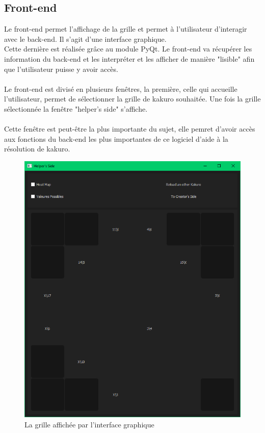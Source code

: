 \documentclass[12pt]{article}
\begin{document}
\subsection{Front-end}
Le front-end permet l'affichage de la grille et permet à l'utilisateur d'interagir avec le back-end. Il s'agit d'une interface graphique. \\ Cette dernière est réalisée grâce au module PyQt. Le front-end va récupérer les information du back-end et les interpréter et les afficher de manière "lisible" afin que l'utilisateur puisse y avoir accès. \\ \\
Le front-end est divisé en plusieurs fenêtres, la première, celle qui accueille l'utilisateur, permet de sélectionner la grille de kakuro souhaitée. Une fois la grille sélectionnée la fenêtre "helper's side" s'affiche. \\ \\ 
Cette fenêtre est peut-être la plus importante du sujet, elle pemret d'avoir accès aux fonctions du back-end les plus importantes de ce logiciel d'aide à la résolution de kakuro. \\
 \begin{figure}[ht]
  \begin{center}
    \includegraphics[scale=0.4]{./ressources/helperside.png} 
  \end{center}
  \caption{La grille affichée par l'interface graphique}
\end{figure}
\end{document}
